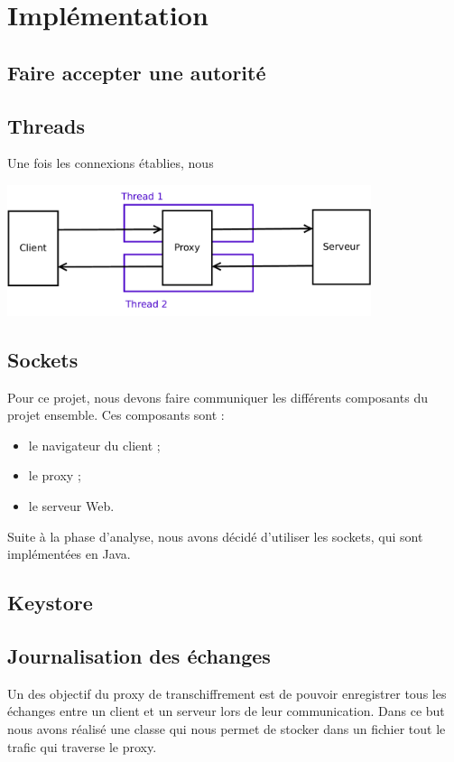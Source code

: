 \documentclass[a4paper,11pt,french]{report}
\begin{document}
\section{Implémentation}
\subsection{Faire accepter une autorité}


\subsection{Threads}

Une fois les connexions établies, nous 

\includegraphics[width=0.8\textwidth]{images/thread.pdf}

\subsection{Sockets}
Pour ce projet, nous devons faire communiquer les différents composants du projet ensemble. Ces composants sont :
\begin{itemize}
\item le navigateur du client ;
\item le proxy ;
\item le serveur Web.
\end{itemize}

Suite à la phase d'analyse, nous avons décidé d'utiliser les sockets, qui sont implémentées en Java.

\subsection{Keystore}


\subsection{Journalisation des échanges}
Un des objectif du proxy de transchiffrement est de pouvoir enregistrer tous les 
échanges entre un client et un serveur lors de leur communication. Dans ce but nous
avons réalisé une classe qui nous permet de stocker dans un fichier tout le trafic qui traverse le proxy.
\end{document}
